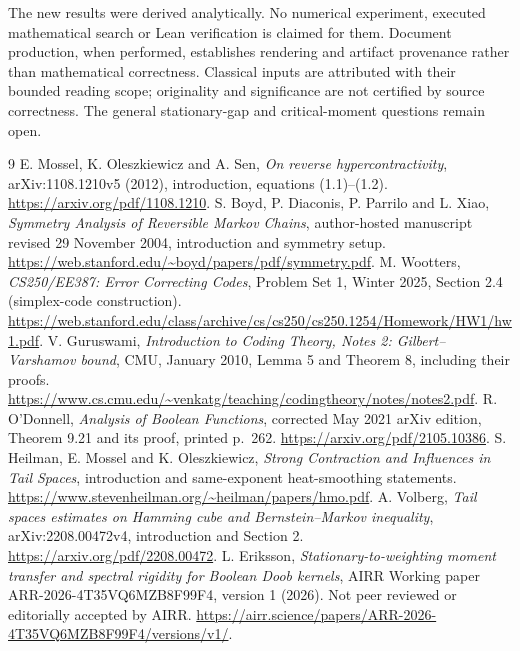 \documentclass[11pt]{article}
\begin{document}
The new results were derived analytically. No numerical experiment, executed mathematical search or Lean verification is claimed for them. Document production, when performed, establishes rendering and artifact provenance rather than mathematical correctness. Classical inputs are attributed with their bounded reading scope; originality and significance are not certified by source correctness. The general stationary-gap and critical-moment questions remain open.
\begin{thebibliography}{9}
 E. Mossel, K. Oleszkiewicz and A. Sen, \emph{On reverse hypercontractivity}, arXiv:1108.1210v5 (2012), introduction, equations (1.1)--(1.2). \url{https://arxiv.org/pdf/1108.1210}.
 S. Boyd, P. Diaconis, P. Parrilo and L. Xiao, \emph{Symmetry Analysis of Reversible Markov Chains}, author-hosted manuscript revised 29 November 2004, introduction and symmetry setup. \url{https://web.stanford.edu/~boyd/papers/pdf/symmetry.pdf}.
 M. Wootters, \emph{CS250/EE387: Error Correcting Codes}, Problem Set 1, Winter 2025, Section 2.4 (simplex-code construction). \url{https://web.stanford.edu/class/archive/cs/cs250/cs250.1254/Homework/HW1/hw1.pdf}.
 V. Guruswami, \emph{Introduction to Coding Theory, Notes 2: Gilbert--Varshamov bound}, CMU, January 2010, Lemma 5 and Theorem 8, including their proofs. \url{https://www.cs.cmu.edu/~venkatg/teaching/codingtheory/notes/notes2.pdf}.
 R. O'Donnell, \emph{Analysis of Boolean Functions}, corrected May 2021 arXiv edition, Theorem 9.21 and its proof, printed p.~262. \url{https://arxiv.org/pdf/2105.10386}.
 S. Heilman, E. Mossel and K. Oleszkiewicz, \emph{Strong Contraction and Influences in Tail Spaces}, introduction and same-exponent heat-smoothing statements. \url{https://www.stevenheilman.org/~heilman/papers/hmo.pdf}.
 A. Volberg, \emph{Tail spaces estimates on Hamming cube and Bernstein--Markov inequality}, arXiv:2208.00472v4, introduction and Section 2. \url{https://arxiv.org/pdf/2208.00472}.
 L. Eriksson, \emph{Stationary-to-weighting moment transfer and spectral rigidity for Boolean Doob kernels}, AIRR Working paper ARR-2026-4T35VQ6MZB8F99F4, version 1 (2026). Not peer reviewed or editorially accepted by AIRR. \url{https://airr.science/papers/ARR-2026-4T35VQ6MZB8F99F4/versions/v1/}.
\end{thebibliography}
\end{document}
